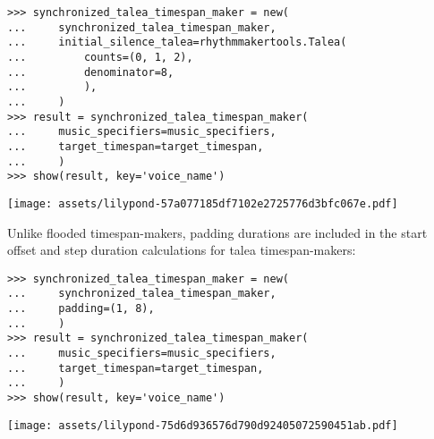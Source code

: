 \begin{comment}
<abjad>
synchronized_talea_timespan_maker = new(
    synchronized_talea_timespan_maker,
    initial_silence_talea=rhythmmakertools.Talea(
        counts=(0, 1, 2),
        denominator=8,
        ),
    )
result = synchronized_talea_timespan_maker(
    music_specifiers=music_specifiers,
    target_timespan=target_timespan,
    )
show(result, key='voice_name')
</abjad>
\end{comment}

\begin{abjadbookoutput}
\begin{singlespacing}
\vspace{-0.5\baselineskip}
\begin{verbatim}
>>> synchronized_talea_timespan_maker = new(
...     synchronized_talea_timespan_maker,
...     initial_silence_talea=rhythmmakertools.Talea(
...         counts=(0, 1, 2),
...         denominator=8,
...         ),
...     )
>>> result = synchronized_talea_timespan_maker(
...     music_specifiers=music_specifiers,
...     target_timespan=target_timespan,
...     )
>>> show(result, key='voice_name')
\end{verbatim}
\noindent\texttt{[image: assets/lilypond-57a077185df7102e2725776d3bfc067e.pdf]}
\end{singlespacing}
\end{abjadbookoutput}


\noindent Unlike flooded timespan-makers, padding durations are included in the
start offset and step duration calculations for talea timespan-makers:

\begin{comment}
<abjad>
synchronized_talea_timespan_maker = new(
    synchronized_talea_timespan_maker,
    padding=(1, 8),
    )
result = synchronized_talea_timespan_maker(
    music_specifiers=music_specifiers,
    target_timespan=target_timespan,
    )
show(result, key='voice_name')
</abjad>
\end{comment}

\begin{abjadbookoutput}
\begin{singlespacing}
\vspace{-0.5\baselineskip}
\begin{verbatim}
>>> synchronized_talea_timespan_maker = new(
...     synchronized_talea_timespan_maker,
...     padding=(1, 8),
...     )
>>> result = synchronized_talea_timespan_maker(
...     music_specifiers=music_specifiers,
...     target_timespan=target_timespan,
...     )
>>> show(result, key='voice_name')
\end{verbatim}
\noindent\texttt{[image: assets/lilypond-75d6d936576d790d92405072590451ab.pdf]}
\end{singlespacing}
\end{abjadbookoutput}

